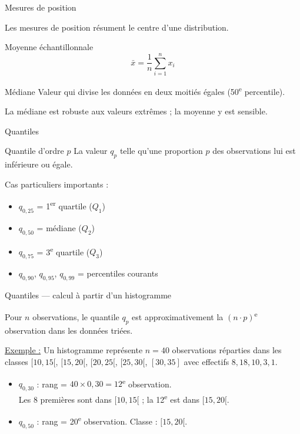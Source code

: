 \documentclass{BeamerTemplate}
\begin{document}
\begin{frame}[t]{Mesures de position}

Les mesures de position résument le \alert{centre} d'une distribution.

\bigskip
\begin{Boite}{Moyenne échantillonnale}
$$\bar{x} = \frac{1}{n}\sum_{i=1}^{n} x_i$$
\end{Boite}

\begin{Boite}{Médiane}
Valeur qui divise les données en deux moitiés égales (50\textsuperscript{e} percentile).
\end{Boite}

\medskip
La \alert{médiane} est robuste aux valeurs extrêmes ; la \alert{moyenne} y est sensible.

\end{frame}

\begin{frame}[t]{Quantiles}

\begin{Boite}{Quantile d'ordre $p$}
La valeur $q_p$ telle qu'une proportion $p$ des observations lui est inférieure ou égale.
\end{Boite}

\medskip
Cas particuliers importants :
\begin{itemize}\itemsep4mm
  \item $q_{0{,}25}$ = 1\textsuperscript{er} quartile ($Q_1$)
  \item $q_{0{,}50}$ = médiane ($Q_2$)
  \item $q_{0{,}75}$ = 3\textsuperscript{e} quartile ($Q_3$)
  \item $q_{0{,}90}$, $q_{0{,}95}$, $q_{0{,}99}$ = percentiles courants
\end{itemize}

\end{frame}

\begin{frame}[t]{Quantiles — calcul à partir d'un histogramme}

Pour $n$ observations, le quantile $q_p$ est approximativement la $(n \cdot p)$\textsuperscript{e} observation dans les données triées.

\bigskip
\underline{Exemple :} Un histogramme représente $n=40$ observations réparties dans les classes $[10,15[$, $[15,20[$, $[20,25[$, $[25,30[$, $[30,35]$ avec effectifs $8, 18, 10, 3, 1$.

\begin{itemize}\itemsep3mm
  \item $q_{0{,}30}$ : rang = $40 \times 0{,}30 = 12$\textsuperscript{e} observation.\\
  Les 8 premières sont dans $[10,15[$ ; la 12\textsuperscript{e} est dans \alert{$[15,20[$}.
  \item $q_{0{,}50}$ : rang = 20\textsuperscript{e} observation. Classe : \alert{$[15,20[$}.
\end{itemize}

\end{frame}
\end{document}
